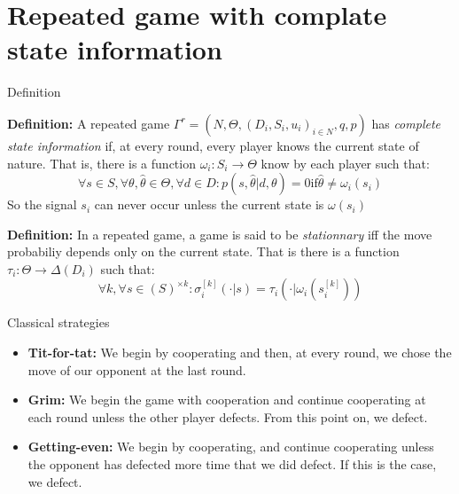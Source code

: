 \section{Repeated game with complate state information}

\begin{frame}{Definition}

\textbf{Definition: }A repeated game $\Gamma^r = (N,\Theta, (D_i,S_i,u_i)_{i\in N},q,p)$ has \textit{complete state information} if, at every round, every player knows the current state of nature. That is, there is a function $\omega_i:S_i \rightarrow \Theta$ know by each player such that:
\begin{equation*}
	\forall s \in S, \forall \theta, \hat{\theta} \in \Theta, \forall d \in D : p(s,\hat{\theta} | d,\theta) = 0 \text{if} \hat{\theta} \neq \omega_i(s_i)
\end{equation*}
So the signal $s_i$ can never occur unless the current state is $\omega(s_i)$

\pause

\textbf{Definition: }In a repeated game, a game is said to be \textit{stationnary} iff the move probabiliy depends only on the current state. That is there is a function $\tau_i : \Theta \rightarrow \Delta(D_i)$ such that:
\begin{equation*}
	\forall k, \forall s \in (S)^{\times k} : \sigma_i^{[k]}(\cdot | s) = \tau_i(\cdot | \omega_i(s_i^{[k]}))
\end{equation*}
\end{frame}

\begin{frame}{Classical strategies}
\begin{itemize}
	\item \textbf{Tit-for-tat:} We begin by cooperating and then, at every round, we chose the move of our opponent at the last round.
	\item \textbf{Grim:} We begin the game with cooperation and continue cooperating at each round unless the other player defects. From this point on, we defect.
	\item \textbf{Getting-even:} We begin by cooperating, and continue cooperating unless the opponent has defected more time that we did defect. If this is the case, we defect.
\end{itemize}
\end{frame}

